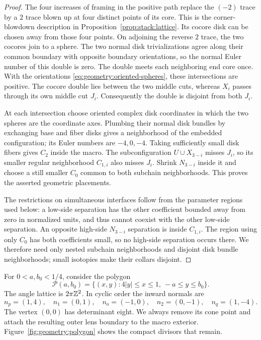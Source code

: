 \begin{proof}
The four increases of framing in the positive path replace the
$(-2)$ trace by a $2$ trace blown up at four distinct points of its
core.  This is the corner-blowdown description in
Proposition~\ref{prop:stack:lattice}.  Its cocore disk can be chosen
away from those four points.  On adjoining the reverse $2$ trace, the
two cocores join to a sphere.  The two normal disk trivializations
agree along their common boundary with opposite boundary orientations,
so the normal Euler number of this double is zero.  The double meets
each neighboring end core once.  With the orientations
\eqref{eq:geometry:oriented-spheres}, these intersections are positive.
The cocore double lies between the two middle cuts, whereas $X_i$
passes through its own middle cut $J_i$.  Consequently the double is
disjoint from both $J_i$.

At each intersection choose oriented complex disk coordinates in
which the two spheres are the coordinate axes.  Plumbing their normal
disk bundles by exchanging base and fiber disks gives a neighborhood
of the embedded configuration; its Euler numbers are $-4,0,-4$.
Taking sufficiently small disk fibers gives $C_2$ inside the macro.
The subconfiguration $U\cup X_{3-i}$ misses $J_i$, so its smaller
regular neighborhood $C_{1,i}$ also misses $J_i$.  Shrink $N_{3-i}$
inside it and choose a still smaller $C_0$ common to both subchain
neighborhoods.  This proves the asserted geometric placements.

The restrictions on simultaneous interfaces follow from the parameter
regions used below: a low-side separation has the other coefficient
bounded away from zero in normalized units, and thus cannot coexist
with the other low-side separation.  An opposite high-side $N_{3-i}$
separation is inside $C_{1,i}$.  The region using only $C_0$ has both
coefficients small, so no high-side separation occurs there.  We
therefore need only nested subchain neighborhoods and disjoint disk
bundle neighborhoods; small isotopies make their collars disjoint.
\end{proof}

For $0<a,b_0<1/4$, consider the polygon
\begin{equation}
 \mathcal P(a,b_0)=
 \{(x,y):4|y|\le x\le1,\ -a\le y\le b_0\}.
 \label{eq:geometry:polygon}
\end{equation}
The angle lattice is $2\pi\mathbb Z^2$.  In cyclic order the inward normals
are
\begin{equation}
 n_p=(1,4),\quad n_1=(0,1),\quad n_o=(-1,0),\quad
 n_2=(0,-1),\quad n_q=(1,-4).
 \label{eq:geometry:normals}
\end{equation}
The vertex $(0,0)$ has determinant eight.  We always remove its cone
point and attach the resulting outer lens boundary to the macro
exterior.  Figure~\ref{fig:geometry:polygon} shows the compact divisors
that remain.

